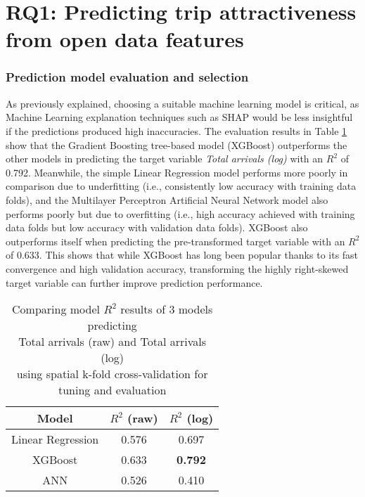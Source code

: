 
\section{RQ1: Predicting trip attractiveness from open data features}
\subsubsection*{Prediction model evaluation and selection}

As previously explained, choosing a suitable machine learning model is critical, as Machine Learning explanation techniques such as SHAP would be less insightful if the predictions produced high inaccuracies. The evaluation results in Table \ref{tab:modeleval} show that the Gradient Boosting tree-based model (XGBoost) outperforms the other models in predicting the target variable \textit{Total arrivals (log)} with an $R^2$ of 0.792. Meanwhile, the simple Linear Regression model performs more poorly in comparison due to underfitting (i.e., consistently low accuracy with training data folds), and the Multilayer Perceptron Artificial Neural Network model also performs poorly but due to overfitting (i.e., high accuracy achieved with training data folds but low accuracy with validation data folds). XGBoost also outperforms itself when predicting the pre-transformed target variable with an $R^2$ of 0.633. This shows that while XGBoost has long been popular thanks to its fast convergence and high validation accuracy, transforming the highly right-skewed target variable can further improve prediction performance. 

\begin{table}[ht]
    \centering
    \renewcommand{\arraystretch}{1.5}
    \begin{tabular}{|c|c|c|}
        \hline
        \rowcolor{lightgray}
        \textbf{Model} & \textbf{$R^2$ (raw)} & \textbf{$R^2$ (log)} \\
        \hline
        Linear Regression & 0.576 & 0.697 \\
        \rowcolor{pink}
        XGBoost & 0.633 & \textbf{0.792} \\
        ANN & 0.526 & 0.410\\
        \hline
    \end{tabular}
    \captionsetup{justification=centering}
    \caption{Comparing model $R^2$ results of 3 models predicting \\Total arrivals (raw) and Total arrivals (log) \\using spatial k-fold cross-validation for tuning and evaluation}
    \label{tab:modeleval}
\end{table}

